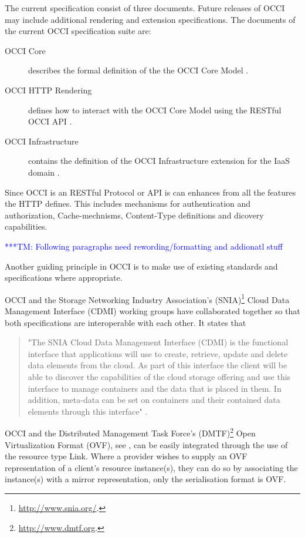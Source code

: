 \documentclass[10pt,conference,final,letterpaper,twoside,twocolumn,]{IEEEtran}
\newcommand{\tmnote}[1]{  {\textcolor{blue}    {***TM: #1}}}
\newcommand{\tmnote}[1]{}
\begin{document}
The current specification consist of three documents.  Future releases
of OCCI may include additional rendering and extension
specifications. The documents of the current OCCI specification suite
are:

\begin{description}
  \item[OCCI Core] describes the formal definition of the the OCCI
    Core Model \cite{occi:core}.
  \item[OCCI HTTP Rendering] defines how to interact with the OCCI
    Core Model using the RESTful OCCI API
    \cite{occi:http_rendering}.
  \item[OCCI Infrastructure] contains the definition of the OCCI
    Infrastructure extension for the IaaS domain
    \cite{occi:infrastructure}.
\end{description}

Since OCCI is an RESTful Protocol or API is can enhances from all the
features the HTTP defines. This includes mechanisms for authentication
and authorization, Cache-mechnisms, Content-Type definitions and
dicovery capabilities. 

\tmnote{Following paragraphs need rewording/formatting and addionatl stuff}

Another guiding principle in OCCI is to make use of existing standards
and specifications where appropriate.

OCCI and the Storage Networking Industry Association's
(SNIA)\footnote{\url{http://www.snia.org/}.} Cloud Data Management
Interface (CDMI) working groups have collaborated together so that
both specifications are interoperable with each other. It states that

\begin{quote}
"The SNIA Cloud Data Management Interface (CDMI) is the functional
  interface that applications will use to create, retrieve, update and
  delete data elements from the cloud. As part of this interface the
  client will be able to discover the capabilities of the cloud
  storage offering and use this interface to manage containers and the
  data that is placed in them. In addition, meta-data can be set on
  containers and their contained data elements through this interface"
  \cite{SSH+2010}.
\end{quote}

OCCI and the Distributed Management Task Force's
(DMTF)\footnote{\url{http://www.dmtf.org}.} Open Virtualization Format
(OVF), see \cite{CDG+2009}, can be easily integrated through the use
of the resource type Link. Where a provider wishes to supply an OVF
representation of a client's resource instance(s), they can do so by
associating the instance(s) with a mirror representation, only the
serialisation format is OVF.
\end{document}
